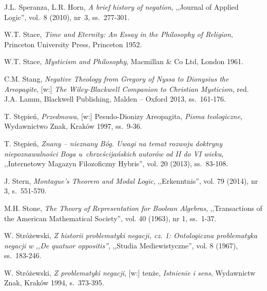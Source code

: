 \begin{thebibliography}{100}
J.L. Speranza, L.R. Horn, \textit{A brief history of negation}, ,,Journal of Applied Logic'', vol.~8 (2010), nr~3, ss.~277-301.


W.T. Stace, \textit{Time and Eternity: An Essay in the Philosophy of Religion}, Princeton University Press, Princeton 1952.

W.T. Stace, \textit{Mysticism and Philosophy}, Macmillan \& Co Ltd, London 1961.

C.M. Stang, \textit{Negative Theology from Gregory of Nyssa to Dionysius the Areopagite}, [w:] \textit{The Wiley-Blackwell Companion to Christian Mysticism},
red. J.A. Lamm, Blackwell Publishing, Malden -- Oxford 2013, ss.~161-176.



T. Stępień, \textit{Przedmowa}, [w:] Pesudo-Dionizy Areopagita, \textit{Pisma teologiczne}, Wydawnictwo Znak, Kraków 1997,  ss.~9-36.

T. Stępień, \textit{Znany -- nieznany Bóg. Uwagi na temat rozwoju doktryny niepoznawalności Boga u~chrześcijańskich autorów od II do VI wieku}, ,,Internetowy Magazyn Filozoficzny Hybris'', vol. 20 (2013), ss.~83-108.

J. Stern, \textit{Montague's Theorem and Modal Logic}, ,,Erkenntnis'', vol. 79 (2014), nr 3, s.~551-570.

M.H. Stone, \textit{The Theory of Representation for Boolean Algebras}, ,,Transactions of the American Mathematical Society'', vol. 40 (1963), nr 1, ss.~1-37.

W. Stróżewski, \textit{Z historii problematyki negacji, cz. 1: Ontologiczna problematyka negacji w ,,De quatuor oppositis''}, ,,Studia Mediewistyczne'', vol. 8 (1967), ss.~183-246.

W. Stróżewski, \textit{Z problematyki negacji}, [w:] tenże, \textit{Istnienie i sens}, Wydawnictw Znak, Kraków 1994, s.~373-395.


\end{thebibliography}
